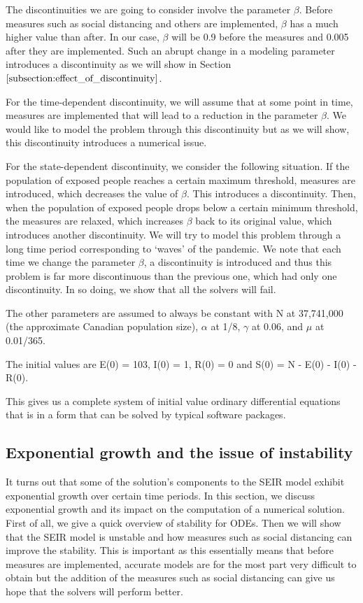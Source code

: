 The discontinuities we are going to consider involve the parameter $\beta$.
Before measures such as social distancing and others are implemented, $\beta$ has a much higher value than after. In our case, $\beta$ will be 0.9 before the measures and 0.005 after they are implemented. Such an abrupt change in a modeling parameter introduces a discontinuity as we will show in Section $\ref{subsection:effect_of_discontinuity}$. 

For the time-dependent discontinuity, we will assume that at some point in time, measures are implemented that will lead to a reduction in the parameter $\beta$. We would like to model the problem through this discontinuity but as we will show, this discontinuity introduces a numerical issue.

For the state-dependent discontinuity, we consider the following situation. If the population of exposed people reaches a certain maximum threshold, measures are introduced, which decreases the value of $\beta$. This introduces a discontinuity. Then, when the population of exposed people drops below a certain minimum threshold, the measures are relaxed, which increases $\beta$ back to its original value, which introduces another discontinuity. We will try to model this problem through a long time period corresponding to `waves' of the pandemic. We note that each time we change the parameter $\beta$, a discontinuity is introduced and thus this problem is far more discontinuous than the previous one, which had only one discontinuity. In so doing, we show that all the solvers will fail.

The other parameters are assumed to always be constant with N at 37,741,000 (the approximate Canadian population size), $\alpha$ at 1/8, $\gamma$ at 0.06, and $\mu$ at 0.01/365.

The initial values are E(0) = 103, I(0) = 1, R(0) = 0 and S(0) = N - E(0) - I(0) - R(0).

This gives us a complete system of initial value ordinary differential equations that is in a form that can be solved by typical software packages.

\subsection{Exponential growth and the issue of instability}
\label{subsection:exponential_growth}
It turns out that some of the solution's components to the SEIR model exhibit exponential growth over certain time periods. In this section, we discuss exponential growth and its impact on the computation of a numerical solution. First of all, we give a quick overview of stability for ODEs. Then we will show that the SEIR model is unstable and how measures such as social distancing can improve the stability. This is important as this essentially means that before measures are implemented, accurate models are for the most part very difficult to obtain but the addition of the measures such as social distancing can give us hope that the solvers will perform better.

